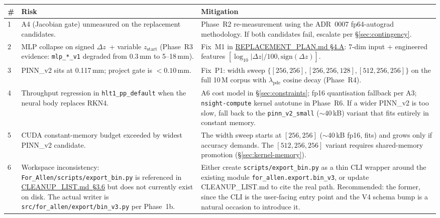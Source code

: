 \documentclass[11pt,a4paper]{article}
\newcommand{\dz}{\ensuremath{\Delta z}}
\newcommand{\code}[1]{\texttt{#1}}
\begin{document}
\begin{longtable}{p{} p{} p{}}
\toprule
\# & Risk & Mitigation \\
\midrule
\endhead
1 & A4 (Jacobian gate) unmeasured on the replacement candidates. &
    Phase~R2 re-measurement using the ADR~0007 fp64-autograd
    methodology. If both candidates fail, escalate per
    \S\ref{sec:contingency}. \\
2 & MLP collapse on signed \dz\ + variable $z_\text{start}$
    (Phase~R3 evidence: \code{mlp\_*\_v1} degraded from 0.3\,mm to
    5--18\,mm). &
    Fix~M1 in \href{run:../../experiments/gen_3/REPLACEMENT_PLAN.md}{REPLACEMENT\_PLAN.md \S4.A}:
    7-dim input + engineered features
    \([\log_{10}\!|\dz|/100, \mathrm{sign}(\dz)]\). \\
3 & PINN\_v2 sits at 0.117\,mm; project gate is $< 0.10$\,mm. &
    Fix~P1: width sweep
    $\{[256,256], [256,256,128], [512,256,256]\}$ on the full 10\,M
    corpus with $\lambda_\text{pde}$ cosine decay (Phase~R4).\\
4 & Throughput regression in \code{hlt1\_pp\_default} when the neural
    body replaces RKN4. &
    A6 cost model in \S\ref{sec:constraints}; fp16 quantisation
    fallback per A3; \code{nsight-compute} kernel autotune in
    Phase~R6. If a wider PINN\_v2 is too slow, fall back to the
    \code{pinn\_v2\_small} ($\sim$40\,kB) variant that fits entirely in
    constant memory. \\
5 & CUDA constant-memory budget exceeded by widest PINN\_v2 candidate. &
    The width sweep starts at $[256,256]$ ($\sim$40\,kB fp16, fits) and
    grows only if accuracy demands. The $[512,256,256]$ variant
    requires shared-memory promotion (\S\ref{sec:kernel-memory}).\\
6 & Workspace inconsistency: \code{For\_Allen/scripts/export\_bin.py} is
    referenced in
    \href{run:../../experiments/gen_3/CLEANUP_LIST.md}{CLEANUP\_LIST.md~\S3.6}
    but does not currently exist on disk. The actual writer is
    \code{src/for\_allen/export/bin\_v3.py} per Phase~1b. &
    Either create \code{scripts/export\_bin.py} as a thin CLI wrapper
    around the existing module \code{for\_allen.export.bin\_v3}, or
    update CLEANUP\_LIST.md to cite the real path. Recommended:
    the former, since the CLI is the user-facing entry point and the
    V4 schema bump is a natural occasion to introduce it. \\
\bottomrule
\end{longtable}
\end{document}

